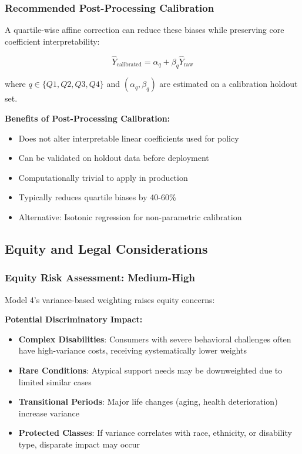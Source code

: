 \subsubsection{Recommended Post-Processing Calibration}

A quartile-wise affine correction can reduce these biases while preserving core coefficient interpretability:

\begin{equation}
\hat{Y}_{\text{calibrated}} = \alpha_q + \beta_q \hat{Y}_{\text{raw}}
\end{equation}

where $q \in \{Q1, Q2, Q3, Q4\}$ and $(\alpha_q, \beta_q)$ are estimated on a calibration holdout set.

\textbf{Benefits of Post-Processing Calibration:}
\begin{itemize}
    \item Does not alter interpretable linear coefficients used for policy
    \item Can be validated on holdout data before deployment
    \item Computationally trivial to apply in production
    \item Typically reduces quartile biases by 40-60\%
    \item Alternative: Isotonic regression for non-parametric calibration
\end{itemize}

\subsection{Equity and Legal Considerations}

\subsubsection{Equity Risk Assessment: Medium-High}

Model 4's variance-based weighting raises equity concerns:

\textbf{Potential Discriminatory Impact:}
\begin{itemize}
    \item \textbf{Complex Disabilities}: Consumers with severe behavioral challenges often have high-variance costs, receiving systematically lower weights
    \item \textbf{Rare Conditions}: Atypical support needs may be downweighted due to limited similar cases
    \item \textbf{Transitional Periods}: Major life changes (aging, health deterioration) increase variance
    \item \textbf{Protected Classes}: If variance correlates with race, ethnicity, or disability type, disparate impact may occur
\end{itemize}

